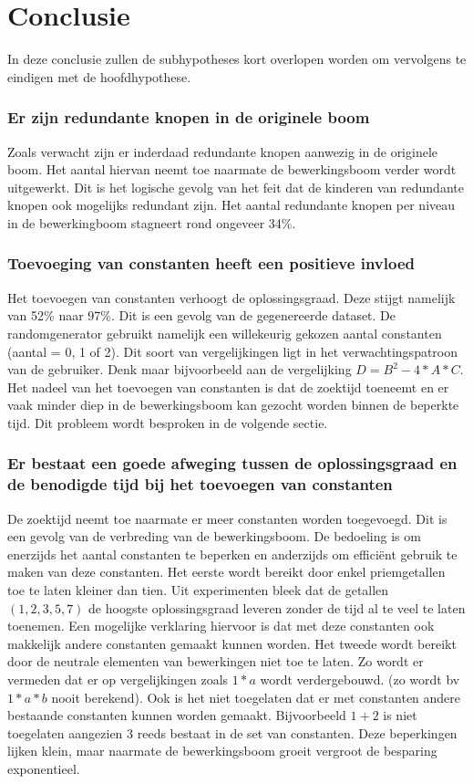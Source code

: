 \documentclass[Main.tex]{subfiles}
\begin{document}
\section{Conclusie}
In deze conclusie zullen de subhypotheses kort overlopen worden om vervolgens te eindigen met de hoofdhypothese.

\subsubsection{Er zijn redundante knopen in de originele boom}
Zoals verwacht zijn er inderdaad redundante knopen aanwezig in de originele boom. Het aantal hiervan neemt toe naarmate de bewerkingsboom verder wordt uitgewerkt. Dit is het logische gevolg van het feit dat de kinderen van redundante knopen ook mogelijks redundant zijn. Het aantal redundante knopen per niveau in de bewerkingboom stagneert rond ongeveer 34\%.

\subsubsection{Toevoeging van constanten heeft een positieve invloed}
Het toevoegen van constanten verhoogt de oplossingsgraad. Deze stijgt namelijk van 52\% naar 97\%. Dit is een gevolg van de gegenereerde dataset. De randomgenerator gebruikt namelijk een willekeurig gekozen aantal constanten (aantal = 0, 1 of 2). Dit soort van vergelijkingen ligt in het verwachtingspatroon van de gebruiker. Denk maar bijvoorbeeld aan de vergelijking $D = B^{2} - 4 \ast A \ast C$. Het nadeel van het toevoegen van constanten is dat de zoektijd toeneemt en er vaak minder diep in de bewerkingsboom kan gezocht worden binnen de beperkte tijd. Dit probleem wordt besproken in de volgende sectie.

\subsubsection{Er bestaat een goede afweging tussen de oplossingsgraad en de benodigde tijd bij het toevoegen van constanten}
De zoektijd neemt toe naarmate er meer constanten worden toegevoegd. Dit is een gevolg van de verbreding van de bewerkingsboom. De bedoeling is om enerzijds het aantal constanten te beperken en anderzijds om effici\"ent gebruik te maken van deze constanten. Het eerste wordt bereikt door enkel priemgetallen toe te laten kleiner dan tien. Uit experimenten bleek dat de getallen $(1, 2, 3, 5, 7)$ de hoogste oplossingsgraad leveren zonder de tijd al te veel te laten toenemen. Een mogelijke verklaring hiervoor is dat met deze constanten ook makkelijk andere constanten gemaakt kunnen worden. Het tweede wordt bereikt door de neutrale elementen van bewerkingen niet toe te laten. Zo wordt er vermeden dat er op vergelijkingen zoals $1*a$ wordt verdergebouwd. (zo wordt bv $1*a*b$ nooit berekend). Ook is het niet toegelaten dat er met constanten andere bestaande constanten kunnen worden gemaakt. Bijvoorbeeld $1+2$ is niet toegelaten aangezien $3$ reeds bestaat in de set van constanten. Deze beperkingen lijken klein, maar naarmate de bewerkingsboom groeit vergroot de besparing exponentieel.
\end{document}
